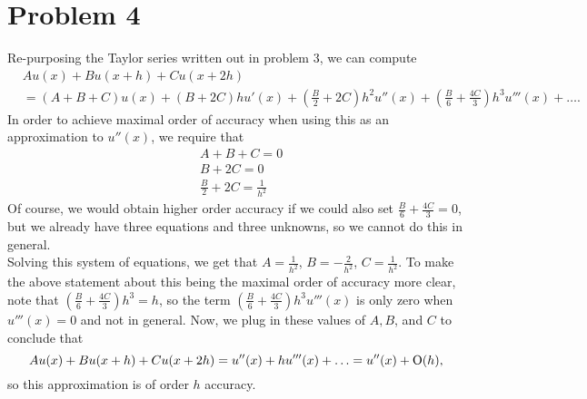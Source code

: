 \documentclass{article}
\begin{document}
\section{Problem 4}
Re-purposing the Taylor series written out in problem 3, we can compute
\begin{align*}
&A u(x) + B u(x+h) + C u(x+2h)\\&=
(A+B+C)u(x)+(B+2C)hu'(x)+ \left(\frac{B}{2}+2C\right)h^2u''(x)+\left(\frac{B}{6}+\frac{4C}{3}\right)h^3u'''(x)+\ldots.   
\end{align*}
In order to achieve maximal order of accuracy when using this as an approximation to $u''(x)$, we require that 
\begin{equation*}
\begin{split}
&A+B+C=0\\
&B+2C=0\\
&\frac{B}{2}+2C=\frac{1}{h^2}
\end{split}
\end{equation*}
Of course, we would obtain higher order accuracy if we could also set $\frac{B}{6}+\frac{4C}{3}=0$, but we already have three equations and three unknowns, so we cannot do this in general. \\
Solving this system of equations, we get that $A=\frac{1}{h^2}$, $B=-\frac{2}{h^2}$, $C=\frac{1}{h^2}$. 
To make the above statement about this being the maximal order of accuracy more clear, note that $\left(\frac{B}{6}+\frac{4C}{3}\right)h^3=h$, so the term $\left(\frac{B}{6}+\frac{4C}{3}\right)h^3u'''(x)$ is only zero when $u'''(x)=0$ and not in general. Now, we plug in these values of $A, B$, and $C$ to conclude that
\[
A u(x) + B u(x+h) + C u(x+2h)=u''(x)+hu'''(x)+\ldots=u''(x)+\operatorname{O}(h),
\]
so this approximation is of order $h$ accuracy.
\end{document}
